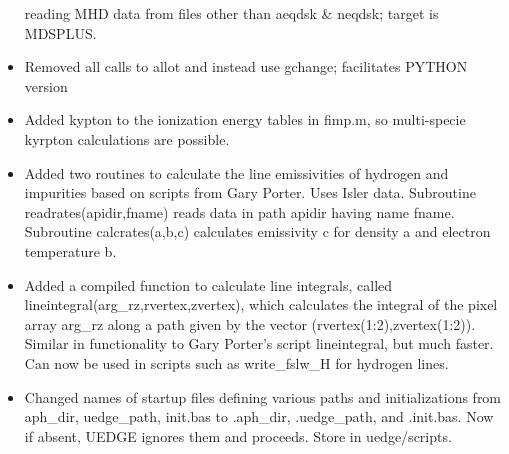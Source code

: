\documentclass [12pt]{article}
\begin{document}
\begin{itemize}
          reading MHD data from files other than aeqdsk \& neqdsk; 
          target is MDSPLUS.
  \item Removed all calls to allot and instead use gchange; 
          facilitates PYTHON version
  \item Added kypton to the ionization energy tables in fimp.m, so
          multi-specie kyrpton calculations are possible.
  \item Added two routines to calculate the line emissivities of
          hydrogen and impurities based on scripts from Gary Porter.
          Uses Isler data.  Subroutine readrates(apidir,fname) reads
          data in path apidir having name fname.  Subroutine
          calcrates(a,b,c) calculates emissivity c for density a and
          electron temperature b.
  \item Added a compiled function to calculate line integrals, called
          lineintegral(arg\_rz,rvertex,zvertex), which calculates the
          integral of the pixel array arg\_rz along a path given by the
          vector (rvertex(1:2),zvertex(1:2)).  Similar in functionality
          to Gary Porter's script lineintegral, but much faster.  Can
          now be used in scripts such as write\_fslw\_H for hydrogen 
          lines.
  \item Changed names of startup files defining various paths and
          initializations from aph\_dir, uedge\_path, init.bas to 
          .aph\_dir, .uedge\_path, and .init.bas.  Now if absent, UEDGE
          ignores them and proceeds.  Store in uedge/scripts.
\end{itemize}
\end{document}
